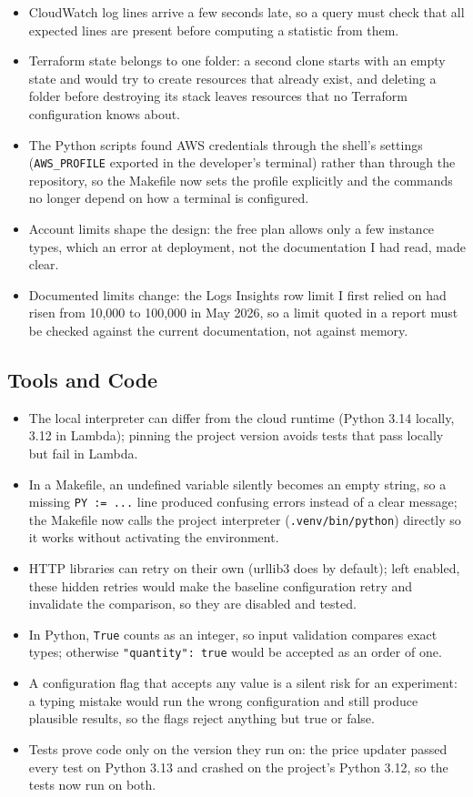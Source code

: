 \documentclass[10pt]{article}
\begin{document}
\begin{itemize}
  reason to discard a warm-up period before measuring.
  \item CloudWatch log lines arrive a few seconds late, so a query must check
  that all expected lines are present before computing a statistic from them.
  \item Terraform state belongs to one folder: a second clone starts with an
  empty state and would try to create resources that already exist, and
  deleting a folder before destroying its stack leaves resources that no
  Terraform configuration knows about.
  \item The Python scripts found AWS credentials through the shell's settings
  (\texttt{AWS\_PROFILE} exported in the developer's terminal) rather than
  through the repository, so the Makefile now sets the profile explicitly and
  the commands no longer depend on how a terminal is configured.
  \item Account limits shape the design: the free plan allows only a few
  instance types, which an error at deployment, not the documentation I had
  read, made clear.
  \item Documented limits change: the Logs Insights row limit I first relied on
  had risen from 10{,}000 to 100{,}000 in May 2026, so a limit quoted in a
  report must be checked against the current documentation, not against
  memory.
\end{itemize}

\subsection{Tools and Code}
\begin{itemize}
  \item The local interpreter can differ from the cloud runtime (Python 3.14
  locally, 3.12 in Lambda); pinning the project version avoids tests that pass
  locally but fail in Lambda.
  \item In a Makefile, an undefined variable silently becomes an empty string,
  so a missing \texttt{PY := ...} line produced confusing errors instead of a
  clear message; the Makefile now calls the project interpreter
  (\texttt{.venv/bin/python}) directly so it works without activating the
  environment.
  \item HTTP libraries can retry on their own (urllib3 does by default); left
  enabled, these hidden retries would make the baseline configuration retry and
  invalidate the comparison, so they are disabled and tested.
  \item In Python, \texttt{True} counts as an integer, so input validation
  compares exact types; otherwise \texttt{"quantity": true} would be accepted
  as an order of one.
  \item A configuration flag that accepts any value is a silent risk for an
  experiment: a typing mistake would run the wrong configuration and still
  produce plausible results, so the flags reject anything but true or false.
  \item Tests prove code only on the version they run on: the price updater
  passed every test on Python 3.13 and crashed on the project's Python 3.12,
  so the tests now run on both.
\end{itemize}
\end{document}
